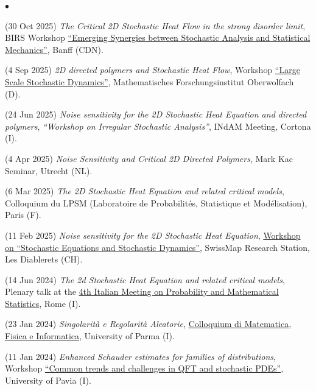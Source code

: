 \documentclass[a4paper,11pt,oneside]{amsart}
\newenvironment{myitemize}{%
\begin{list}{$\bullet$}%
 	{%
	\setlength{\itemsep}{0.3em}%
	\setlength{\topsep}{0.3em}%
	\setlength{\partopsep}{0em}%
	\setlength{\parsep}{0em}%
	\setlength{\parskip}{0em}%
	\setlength\leftmargin{1.5em}%
	\setlength\labelwidth{1.1em}%
	\setlength{\labelsep}{0.4em}%
	}%
	}%
{\end{list}}
\renewenvironment{itemize}{
\begin{myitemize}}%
{\end{myitemize}}
\begin{document}
\begin{itemize}
\item (30 Oct 2025)
\emph{The Critical 2D Stochastic Heat Flow in the strong disorder limit},
BIRS Workshop \href{https://www.birs.ca/events/2025/5-day-workshops/25w5367}{``Emerging Synergies between Stochastic Analysis and Statistical Mechanics''},
Banff (CDN).

\item (4 Sep 2025)
\emph{2D directed polymers and Stochastic Heat Flow},
Workshop  \href{https://www.mfo.de/www/activity/2536}{``Large Scale Stochastic Dynamics''},
Mathematisches Forschungsinstitut Oberwolfach (D).

\item (24 Jun 2025)
\emph{Noise sensitivity for the 2D Stochastic Heat Equation and directed polymers},
\emph{``Workshop on Irregular Stochastic Analysis''},
INdAM Meeting, Cortona (I).

\item (4 Apr 2025)
\emph{Noise Sensitivity and Critical 2D Directed Polymers},
Mark Kac Seminar, Utrecht (NL).

\item (6 Mar 2025)
\emph{The 2D Stochastic Heat Equation and related critical models},
Colloquium du LPSM (Laboratoire de Probabilités, Statistique et Modélisation),
Paris (F).

\item (11 Feb 2025)
\emph{Noise sensitivity for the 2D Stochastic Heat Equation},
\href{https://www.epfl.ch/labs/stoan/stoan/past-events/workshop-on-stochastic-equations-and-stochastic-dynamics/}{Workshop on ``Stochastic Equations and Stochastic Dynamics''},
SwissMap Research Station, Les Diablerets (CH).

\item (14 Jun 2024)
\emph{The 2d Stochastic Heat Equation and related critical models},
Plenary talk at the
\href{https://probabilityrome2024.it/plenary-speakers/}{4th Italian Meeting on
Probability and Mathematical Statistics},
Rome (I).

\item (23 Jan 2024)
\emph{Singolarità e Regolarità Aleatorie},
\href{https://www.unipr.it/node/104243}{Colloquium di Matematica, Fisica e Informatica},
University of Parma (I).

\item (11 Jan 2024)
\emph{Enhanced Schauder estimates for families of distributions},
Workshop \href{https://sites.google.com/view/spdesqft/home}{``Common trends and challenges in QFT and stochastic PDEs''},
University of Pavia (I).


\end{itemize}
\end{document}
